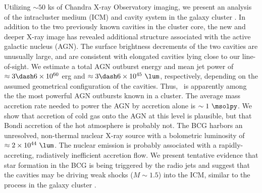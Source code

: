 Utilizing $\sim 50$ ks of Chandra X-ray Observatory imaging, we present an analysis of the intracluster medium (ICM) and cavity system in the galaxy cluster \rbs. In addition to the two previously known cavities in the cluster core, the new and deeper X-ray image has revealed additional structure associated with the active galactic nucleus (AGN). The surface brightness decrements of the two cavities are unusually large, and are consistent with elongated cavities lying close to our line-of-sight. We estimate a total AGN outburst energy and mean jet power of $\approx 3 \dash 6 \times 10^{60}$ erg and $\approx 3 \dash 6 \times 10^{45} ~\lum$, respectively, depending on the assumed geometrical configuration of the cavities. Thus, \rbs\ is apparently among the the most powerful AGN outbursts known in a cluster. The average mass accretion rate needed to power the AGN by accretion alone is $\sim 1 ~\msolpy$. We show that accretion of cold gas onto the AGN at this level is plausible, but that Bondi accretion of the hot atmosphere is probably not. The BCG harbors an unresolved, non-thermal nuclear X-ray source with a bolometric luminosity of $\approx 2 \times 10^{44} ~\lum$. The nuclear emission is probably associated with a rapidly-accreting, radiatively inefficient accretion flow. We present tentative evidence that star formation in the BCG is being triggered by the radio jets and suggest that the cavities may be driving weak shocks ($M \sim 1.5$) into the ICM, similar to the process in the galaxy cluster \ms. 
